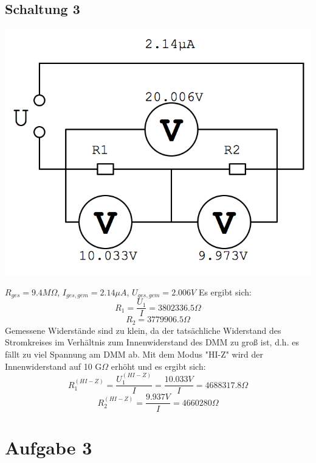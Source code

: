 \documentclass[compress,11pt]{beamer}
\begin{document}
\subsection{Schaltung 3}
\begin{frame}
\includegraphics[width=\textwidth]{images/23.png}
\end{frame}
\begin{frame}
$R_{ges} = 9.4 M \Omega$, $I_{ges,gem} = 2.14 \mu A$, $U_{ges,gem} = 2.006 V$
Es ergibt sich:
\begin{equation}
R_1 = \frac{U_1}{I} = 3802336.5 \Omega
\end{equation}
\begin{equation}
R_2 = 3779906.5 \Omega
\end{equation}
Gemessene Widerstände sind zu klein, da der tatsächliche Widerstand des Stromkreises im Verhältnis zum Innenwiderstand des DMM zu groß ist, d.h. es fällt zu viel Spannung am DMM ab. Mit dem Modus "HI-Z" wird der Innenwiderstand auf 10 G$\Omega$ erhöht und es ergibt sich:
\begin{equation}
R_1^{(HI-Z)} = \frac{U_1^{(HI-Z)}}{I} = \frac{10.033 V}{I}= 4688317.8 \Omega
\end{equation}
\begin{equation}
R_2^{(HI-Z)} = \frac{9.937 V}{I}=4660280 \Omega
\end{equation}
\end{frame}

\section{Aufgabe 3}
\end{document}
